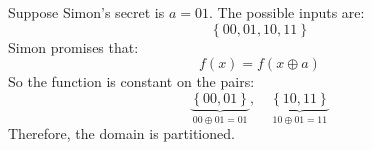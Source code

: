 \begin{examplebox}
    Suppose Simon's secret is $a = 01$. The possible inputs are:
    \begin{equation*}
        \left\{00, 01, 10, 11\right\}
    \end{equation*}
    Simon promises that:
    \begin{equation*}
        f(x) = f(x \oplus a)
    \end{equation*}
    So the function is constant on the pairs:
    \begin{equation*}
        \underbrace{\left\{00, 01\right\}}_{
            00 \oplus 01 = 01
        },\quad \underbrace{\left\{10, 11\right\}}_{
            10 \oplus 01 = 11
        }
    \end{equation*}
    Therefore, the domain is partitioned.


\end{examplebox}
